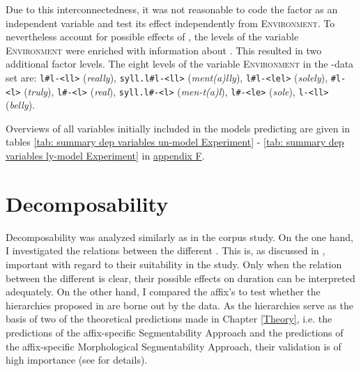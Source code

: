  Due to this interconnectedness, it was not reasonable to code the factor  as an independent variable and test its effect independently from \textsc{Environment}. 
 To nevertheless account for possible effects of , the levels of the variable \textsc{Environment} were enriched with information about . 
This resulted in two additional factor levels.
   The eight levels of the variable \textsc{Environment} in the -data set are: \texttt{l\#l-<ll>} (\textit{really}), \texttt{syll.l\#l-<ll>} (\textit{ment(a)lly}), \texttt{l\#l-<lel>} (\textit{solely}), \texttt{\#l-<l>} (\textit{truly}), \texttt{l\#-<l>} (\textit{real}), \texttt{syll.l\#-<l>} (\textit{men-t(a)l}),  \texttt{l\#-<le>} (\textit{sole}), \texttt{l-<ll> }(\textit{belly}). 		

Overviews of all variables initially included in the models predicting  are given in tables \ref{tab: summary dep variables un-model Experiment} - \ref{tab: summary dep variables ly-model Experiment} in \hyperref[Appendix F Summaries of variables in initial models of experimental study]{appendix F}.



\section{Decomposability} \label{decomposability experiment}


 

Decomposability was analyzed similarly as in the corpus study. On the one hand, I investigated the relations between the different . This is, as discussed in , important with regard to their suitability in the study. Only when the relation between the different  is clear, their possible effects on duration can be interpreted adequately.  
On the other hand, I compared the affix's  to test whether the  hierarchies proposed in  are borne out by the data.  As the hierarchies serve as the basis of two of the theoretical predictions made in Chapter \ref{Theory}, i.e. the predictions of the affix-specific Segmentability Approach and the predictions of the affix-specific Morphological Segmentability Approach, their validation is of high importance (see  for details). 




